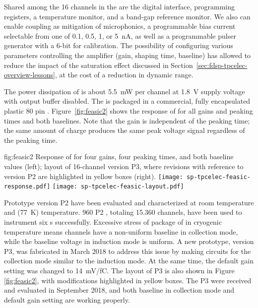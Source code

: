 Shared among the \num{16} channels in the   are 
the digital interface, programming registers, a temperature monitor, 
and a band-gap reference monitor. We also can enable  
coupling as mitigation of microphonics, a programmable bias current 
selectable from one of \num{0.1}, \num{0.5}, \num{1}, or \SI{5}{nA}, 
as well as a programmable pulser generator with a \num{6}-bit 
 for calibration. The possibility of configuring various
parameters controlling the  amplifier (gain, shaping time,
baseline) has allowed  to reduce the impact of the
saturation effect discussed in Section~\ref{sec:fdsp-tpcelec-overview-lessons}, 
at the cost of a reduction in dynamic range.

The power dissipation of   is about \SI{5.5}{mW} 
per channel at \SI{1.8}{V} supply voltage with output buffer disabled. 
The  is packaged in a commercial, fully encapsulated 
plastic \num{80} pin . Figure~\ref{fig:feasic2} shows the 
response of   for all gains and peaking times 
and both baselines. Note that the gain is independent of the peaking 
time; the same amount of charge produces the same peak voltage signal 
regardless of the peaking time.

\begin{dunefigure}
{fig:feasic2}
{Response of   for four gains, four peaking times, 
and both baseline values (left); layout of \num{16}-channel  
 version P3, where revisions with reference to version 
P2 are highlighted in yellow boxes (right).}
\texttt{[image: sp-tpcelec-feasic-response.pdf]}
\hspace{6mm}
\texttt{[image: sp-tpcelec-feasic-layout.pdf]}
\end{dunefigure}

Prototype version P2   have been evaluated and 
characterized at room temperature and \lntwo (\SI{77}{K}) temperature. 
\num{960} P2  , totaling \num{15,360} channels, 
have been used to instrument six  s successfully. 
Excessive stress of package of   in cryogenic 
temperature means  channels have a non-uniform baseline in 
collection mode, while the baseline  voltage in induction mode 
is uniform. A new prototype, version P3, was fabricated in March 2018 
to address this issue by making  circuits for the collection mode 
similar to the induction mode. At the same time, the default gain
setting was changed to \SI{14}{mV/fC}. The layout of P3  
 is also shown in Figure \ref{fig:feasic2}, with modifications 
highlighted in yellow boxes. The P3   were 
received and evaluated in September 2018, and both baseline in collection 
mode and default gain setting are working properly.

